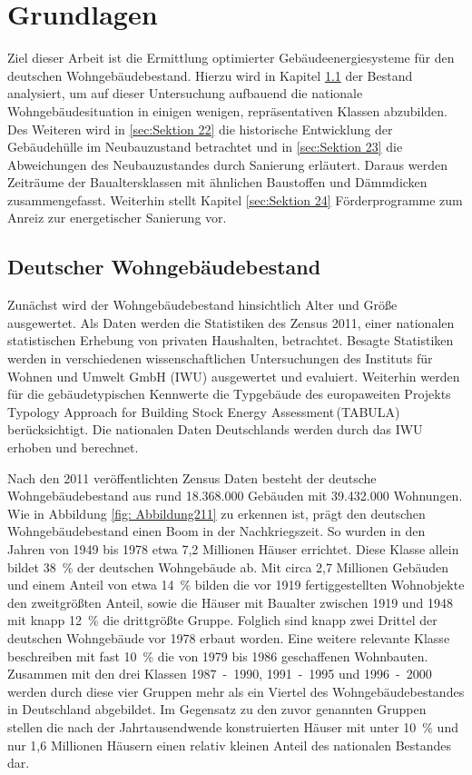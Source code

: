 \chapter{Grundlagen}

Ziel dieser Arbeit ist die Ermittlung optimierter Gebäudeenergiesysteme für den deutschen Wohngebäudebestand.
Hierzu wird in Kapitel \ref{sec:Sektion 21} der Bestand analysiert, um auf dieser Untersuchung aufbauend die nationale Wohngebäudesituation in einigen wenigen, repräsentativen Klassen abzubilden. 
Des Weiteren wird in \ref{sec:Sektion 22} die historische Entwicklung der Gebäudehülle im Neubauzustand betrachtet und in \ref{sec:Sektion 23} die Abweichungen des Neubauzustandes durch Sanierung erläutert. Daraus werden Zeiträume der Baualtersklassen mit ähnlichen Baustoffen und Dämmdicken zusammengefasst. 
Weiterhin stellt Kapitel \ref{sec:Sektion 24} Förderprogramme zum Anreiz zur energetischer Sanierung vor.

\section{Deutscher Wohngebäudebestand}
\label{sec:Sektion 21}

Zunächst wird der Wohngebäudebestand hinsichtlich Alter und Größe ausgewertet.
Als Daten werden die Statistiken des Zensus 2011, einer nationalen statistischen Erhebung von privaten Haushalten, betrachtet. 
Besagte Statistiken werden in verschiedenen wissenschaftlichen Untersuchungen des Instituts für Wohnen und Umwelt GmbH (IWU) ausgewertet und evaluiert.
Weiterhin werden für die gebäudetypischen Kennwerte die Typgebäude des europaweiten Projekts \glqq Typology Approach for Building Stock Energy Assessment\grqq\,(TABULA) berücksichtigt. Die nationalen Daten Deutschlands werden durch das IWU erhoben und berechnet.

Nach den 2011 veröffentlichten Zensus Daten besteht der deutsche Wohngebäudebestand aus rund 18.368.000 Gebäuden mit 39.432.000 Wohnungen.
Wie in Abbildung \ref{fig: Abbildung211} zu erkennen ist, prägt den deutschen Wohngebäudebestand einen Boom in der Nachkriegszeit. 
So wurden in den Jahren von 1949 bis 1978 etwa 7,2 Millionen Häuser errichtet. Diese Klasse allein bildet \mbox{38 \%} der deutschen Wohngebäude ab. 
Mit circa 2,7 Millionen Gebäuden und einem Anteil von etwa \mbox{14 \%} bilden die vor 1919 fertiggestellten Wohnobjekte den zweitgrößten Anteil, sowie die Häuser mit Baualter zwischen 1919 und 1948 mit knapp \mbox{12 \%} die drittgrößte Gruppe.
Folglich sind knapp zwei Drittel der deutschen Wohngebäude vor 1978 erbaut worden.
Eine weitere relevante Klasse beschreiben mit fast \mbox{10 \%} die von 1979 bis 1986 geschaffenen Wohnbauten. 
Zusammen mit den drei Klassen \mbox{1987 - 1990,} \mbox{1991 - 1995} und \mbox{1996 - 2000} werden  durch diese vier Gruppen mehr als ein Viertel des Wohngebäudebestandes in Deutschland abgebildet.
Im Gegensatz zu den zuvor genannten Gruppen stellen die nach der Jahrtausendwende konstruierten Häuser mit unter \mbox{10 \%} und nur 1,6 Millionen Häusern einen relativ kleinen Anteil des nationalen Bestandes dar. \cite{.2015}

